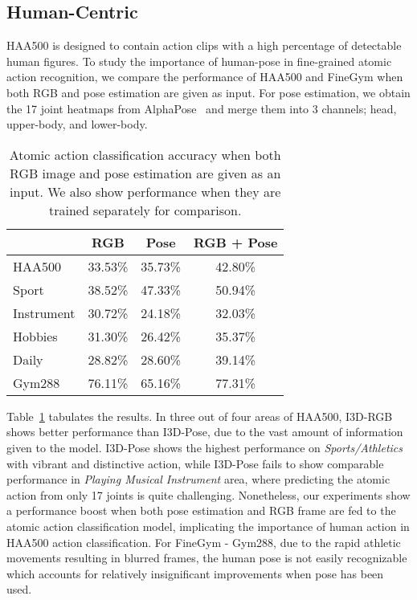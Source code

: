 \documentclass[10pt,twocolumn,letterpaper]{article}
\begin{document}
\subsection{Human-Centric}

HAA500 is designed to contain action clips with a high percentage of detectable human figures.
To study the importance of human-pose in fine-grained atomic action recognition, we compare the performance of HAA500 and FineGym when both RGB and pose estimation are given as input. For pose estimation, we obtain the 17 joint heatmaps from AlphaPose~\cite{alphapose} and merge them into 3 channels; head, upper-body, and lower-body.

\begin{table}[t]
    {\small 
    \begin{center}
        \begin{tabular}{l |c |c || c }
        \hline
          & RGB  & Pose & RGB + Pose \\
        \hline
        HAA500                    & 33.53\% & 35.73\% & 42.80\% \\
        \:\:\: Sport              & 38.52\% & 47.33\% & 50.94\% \\ 
        \:\:\: Instrument         & 30.72\% & 24.18\% & 32.03\% \\ 
        \:\:\: Hobbies            & 31.30\% & 26.42\% & 35.37\% \\ 
        \:\:\: Daily              & 28.82\% & 28.60\% & 39.14\% \\
Gym288~\cite{finegym} & 76.11\% & 65.16\% & 77.31\% \\
        \hline
        \end{tabular}
    \end{center}}
    \caption{Atomic action classification accuracy when both RGB image and pose estimation are given as an input. We also show performance when they are trained separately for comparison.}
    \label{table:human-pose}
    \vspace{-0.5em}
\end{table}

Table~\ref{table:human-pose} tabulates the results. In three out of four areas of HAA500, I3D-RGB shows better performance than I3D-Pose, due to the vast amount of information given to the model. I3D-Pose shows the highest performance on \textit{Sports/Athletics} with vibrant and distinctive action, while I3D-Pose fails to show comparable performance in \textit{Playing Musical Instrument} area, where predicting the atomic action from only 17 joints is quite challenging.  Nonetheless, our experiments show a performance boost when both pose estimation and RGB frame are fed to the atomic action classification model, implicating the importance of human action in HAA500 action classification. For FineGym - Gym288, due to the rapid athletic movements resulting in blurred frames, the human pose is not easily recognizable which accounts for relatively insignificant improvements when pose has been used.
\end{document}
